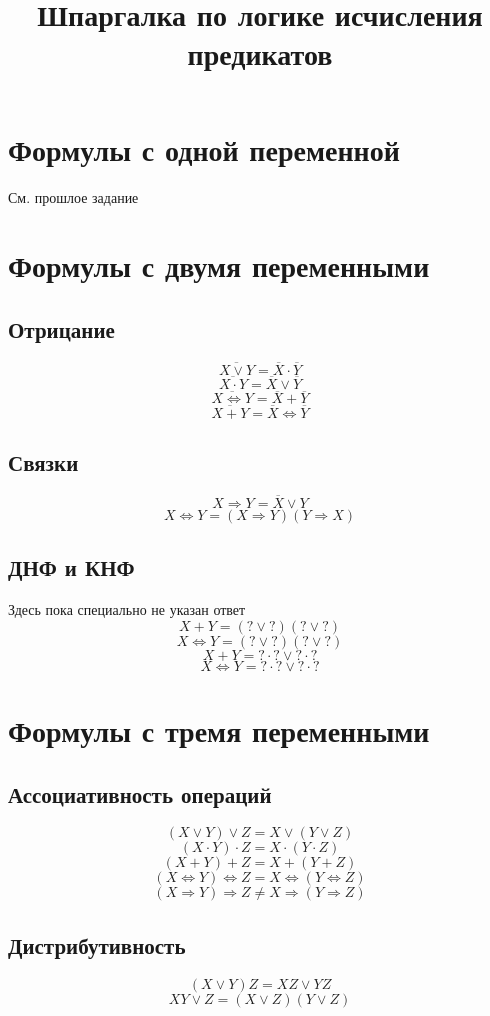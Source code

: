 \documentclass{article}
\title{Шпаргалка по логике исчисления предикатов}
\author{}
\date{}
\numberwithin{equation}{subsection}
\renewcommand{\[}{\begin{equation}}
\renewcommand{\]}{\end{equation}}
\begin{document}
    \section{Формулы с одной переменной}

    См. прошлое задание

    \section{Формулы с двумя переменными}

    \subsection{Отрицание}
    \[\overline{X\vee Y} = \overline{X}\cdot\overline{Y}\]
    \[\overline{X\cdot Y} = \overline{X}\vee\overline{Y}\]
    \[\overline{X\Leftrightarrow Y} = \overline{X}+\overline{Y}\]
    \[\overline{X + Y} = \overline{X}\Leftrightarrow\overline{Y}\]

    \subsection{Связки}
    \[X\Rightarrow Y = \overline{X} \vee Y \]
    \[X\Leftrightarrow Y = (X\Rightarrow Y)(Y\Rightarrow X)\]

    \subsection{ДНФ и КНФ}
    Здесь пока специально не указан ответ
    \[X + Y = (? \vee ?)(? \vee ?)\]
    \[X \Leftrightarrow Y = (? \vee ?)(? \vee ?)\]
    \[X + Y = ?\cdot? \vee ?\cdot?\]
    \[X \Leftrightarrow Y = ?\cdot? \vee ?\cdot?\]

    \section{Формулы с тремя переменными}
    \subsection{Ассоциативность операций}
    \[(X \vee Y) \vee Z = X \vee (Y \vee Z)\]
    \[(X \cdot Y) \cdot Z = X \cdot (Y \cdot Z)\]
    \[(X + Y) + Z = X + (Y + Z)\]
    \[(X \Leftrightarrow Y) \Leftrightarrow Z = X \Leftrightarrow (Y \Leftrightarrow Z)\]
    \[(X \Rightarrow Y) \Rightarrow Z \ne X \Rightarrow (Y \Rightarrow Z)\]

    \subsection{Дистрибутивность}
    \[(X\vee Y)Z = XZ \vee YZ\]
    \[XY \vee Z = (X \vee Z)(Y \vee Z)\]
\end{document}
